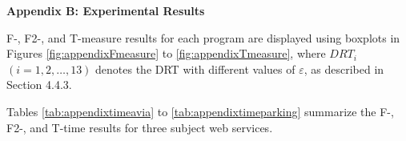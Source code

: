 \documentclass[10pt,journal,cspaper,compsoc,onecolumn]{IEEEtran}
\newcommand{\Fig}{fig/}
\begin{document}
\large{\textbf{Appendix B: Experimental Results}}

F-, F2-, and T-measure results for each program are displayed using boxplots in Figures \ref{fig:appendixFmeasure} to \ref{fig:appendixTmeasure}, where $DRT_i$ $(i = 1,2, \ldots, 13)$ denotes the DRT with different values of $\varepsilon$, as described in Section 4.4.3.

\begin{figure*}[h]
	\centering
	\caption{F-measure boxplots for each web service}
	\label{fig:appendixFmeasure}
\end{figure*}

\begin{figure*}
	\centering
	\caption{F2-measure boxplots for each web service}
	\label{fig:appendixF2measure}
\end{figure*}

\begin{figure*}
	\centering
	\caption{T-measure boxplots for each web service}
	\label{fig:appendixTmeasure}
\end{figure*}


Tables \ref{tab:appendixtimeavia} to \ref{tab:appendixtimeparking} summarize the F-, F2-, and T-time results for three subject web services.
\end{document}
